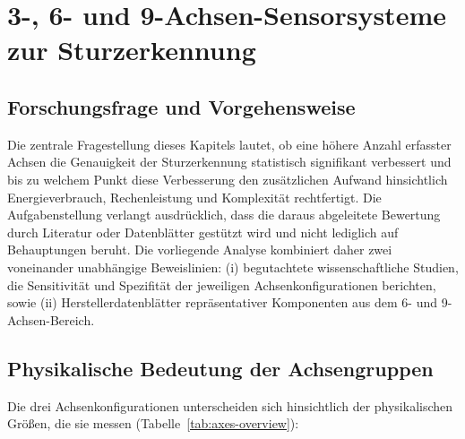 \documentclass[11pt,a4paper,oneside]{report}
\begin{document}
\chapter{3-, 6- und 9-Achsen-Sensorsysteme zur Sturzerkennung}
\label{ch:comparison}

\section{Forschungsfrage und Vorgehensweise}
\label{sec:question}
Die zentrale Fragestellung dieses Kapitels lautet, ob eine höhere Anzahl
erfasster Achsen die Genauigkeit der Sturzerkennung statistisch signifikant
verbessert und bis zu welchem Punkt diese Verbesserung den zusätzlichen Aufwand
hinsichtlich Energieverbrauch, Rechenleistung und Komplexität rechtfertigt. Die
Aufgabenstellung verlangt ausdrücklich, dass die daraus abgeleitete Bewertung
durch Literatur oder Datenblätter gestützt wird und nicht lediglich auf
Behauptungen beruht. Die vorliegende Analyse kombiniert daher zwei voneinander
unabhängige Beweislinien: (i) begutachtete wissenschaftliche Studien, die
Sensitivität und Spezifität der jeweiligen Achsenkonfigurationen berichten,
sowie (ii) Herstellerdatenblätter repräsentativer Komponenten aus dem 6- und
9-Achsen-Bereich.

\section{Physikalische Bedeutung der Achsengruppen}
\label{sec:physics}
Die drei Achsenkonfigurationen unterscheiden sich hinsichtlich der
physikalischen Größen, die sie messen
(Tabelle~\ref{tab:axes-overview}):
\end{document}
